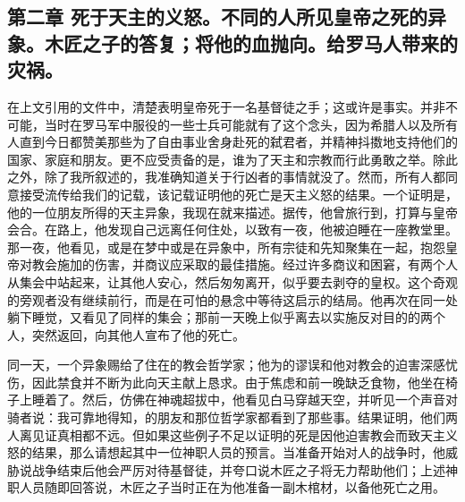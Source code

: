 \par


\subsection{第二章 死于天主的义怒。不同的人所见皇帝之死的异象。木匠之子的答复；将他的血抛向。给罗马人带来的灾祸。}

在上文引用的文件中，清楚表明皇帝死于一名基督徒之手；这或许是事实。并非不可能，当时在罗马军中服役的一些士兵可能就有了这个念头，因为希腊人以及所有人直到今日都赞美那些为了自由事业舍身赴死的弑君者，并精神抖擞地支持他们的国家、家庭和朋友。更不应受责备的是，谁为了天主和宗教而行此勇敢之举。除此之外，除了我所叙述的，我准确知道关于行凶者的事情就没了。然而，所有人都同意接受流传给我们的记载，该记载证明他的死亡是天主义怒的结果。一个证明是，他的一位朋友所得的天主异象，我现在就来描述。据传，他曾旅行到，打算与皇帝会合。在路上，他发现自己远离任何住处，以致有一夜，他被迫睡在一座教堂里。那一夜，他看见，或是在梦中或是在异象中，所有宗徒和先知聚集在一起，抱怨皇帝对教会施加的伤害，并商议应采取的最佳措施。经过许多商议和困窘，有两个人从集会中站起来，让其他人安心，然后匆匆离开，似乎要去剥夺的皇权。这个奇观的旁观者没有继续前行，而是在可怕的悬念中等待这启示的结局。他再次在同一处躺下睡觉，又看见了同样的集会；那前一天晚上似乎离去以实施反对目的的两个人，突然返回，向其他人宣布了他的死亡。\par

同一天，一个异象赐给了住在的教会哲学家；他为的谬误和他对教会的迫害深感忧伤，因此禁食并不断为此向天主献上恳求。由于焦虑和前一晚缺乏食物，他坐在椅子上睡着了。然后，仿佛在神魂超拔中，他看见白马穿越天空，并听见一个声音对骑者说：我可靠地得知，的朋友和那位哲学家都看到了那些事。结果证明，他们两人离见证真相都不远。但如果这些例子不足以证明的死是因他迫害教会而致天主义怒的结果，那么请想起其中一位神职人员的预言。当准备开始对人的战争时，他威胁说战争结束后他会严厉对待基督徒，并夸口说木匠之子将无力帮助他们；上述神职人员随即回答说，木匠之子当时正在为他准备一副木棺材，以备他死亡之用。\par

